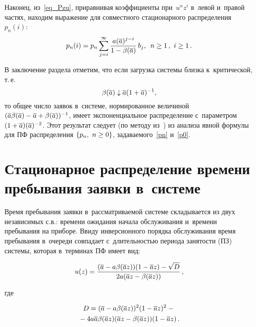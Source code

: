 \begin{multicols}{2}
Наконец, из~\eqref{eq_Pzu}, приравнивая коэффициенты
при~$u^n z^i$ в~левой и~правой частях,
находим выражение для совместного стационарного распределения~$p_n(i)$:
$$
p_n(i)=p_n \sum\limits_{j=i}^{\infty} 
\fr{a(\overline{a})^{j-i} }{1-\beta(\overline{a})}\,b_j , \enskip  n\geq 1\,, \ 
 i \geq 1\,.
$$

В заключение раздела отметим, что если загрузка системы близка к~критической,
т.\,е.\ 
$$
\beta(\overline{a}) \downarrow \overline{a} (1\hm+\overline{a})^{-1},
$$
то общее число заявок в~системе, нормированное величиной 
$(\overline{a} \beta(\overline{a}) \hm- \overline{a} \hm+ \beta(\overline{a}))^{-1}$,
имеет экспоненциальное распределение с~параметром 
$(1\hm+\overline{a})(\overline{a})^{-2}$.
Этот результат следует (по методу из~\cite{opech}) из анализа явной формулы для 
ПФ распределения $\{ p_n, \ n \hm\ge 0 \}$, задаваемого~\eqref{pn} и~\eqref{p0}.


\section{Стационарное распределение времени пребывания заявки в~системе}

Время пребывания заявки в~рассматриваемой системе складывается из
двух независимых с.в.: времени ожидания
начала обслуживания и~времени пребывания на приборе.
Ввиду инверсионного порядка обслуживания время пребывания в~очереди совпадает с~длительностью
периода занятости (ПЗ) системы, которая в~терминах ПФ имеет вид:

\vspace*{4pt}

\noindent
\begin{equation}
\label{us}
u(z) = \displaystyle\frac{\displaystyle (\overline{a}-a\beta(\overline{a} z))(1-\overline{a} z) - \sqrt{D}
\mathstrut}{\displaystyle 2 a (\overline{a} z - \beta(\overline{a} z))\mathstrut}\,,
\end{equation}

\vspace*{-3pt}

\noindent
где 

\vspace*{-3pt}

\noindent
\begin{multline*}
D = (\overline{a}-a\beta(\overline{a} z))^2(1-\overline{a} z)^2 
-{}\\
{}- 4a \overline{a}\beta(\overline{a} z)(\overline{a} z - 
\beta(\overline{a} z))(1\hm-\overline{a} z)\,.
\end{multline*}


\end{multicols}
